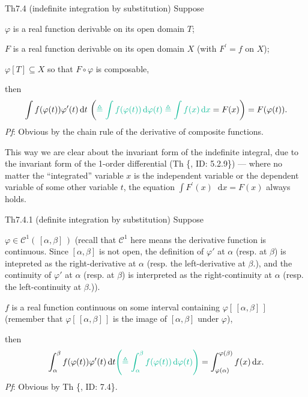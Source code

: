 \documentclass{article}
\newcommand{\dif}{\mathop{}\!\mathrm{d}}
\begin{document}
\begin{Th}{Th7.4 (indefinite integration by substitution)}
    Suppose
    \begin{compactenum}
        \item $\varphi$ is a real function derivable on its open domain $T$;
        \item $F$ is a real function derivable on its open domain $X$ (with $F^\prime = f$ on $X$);
        \item $\varphi[T]\subseteq X$ so that $F\circ\varphi$ is composable,
    \end{compactenum}
    then
    $$\int f(\varphi(t))\varphi'(t)\dif t\, \left(\textcolor{Df}{ \triangleq \int f(\varphi(t))\dif \varphi(t) \triangleq \int f(x)\dif x} = F(x)\right) = F(\varphi(t)). $$
    \tcblower
    \textit{Pf}: Obvious by the chain rule of the derivative of composite functions.
\end{Th}

\begin{Rmk}{}
    This way we are clear about the invariant form of the indefinite integral, due to the invariant form of the 1-order differential (Th \{, ID: 5.2.9\}) — where no matter the ``integrated'' variable $x$ is the independent variable or the dependent variable of some other variable $t$, the equation $\int F^\prime(x)\dif x = F(x)$ always holds.
\end{Rmk}

\begin{Th}{Th7.4.1 (definite integration by substitution)}
    Suppose
    \begin{compactenum}
        \item $\varphi\in\mathcal{C}^1(\,[\alpha, \beta]\,)$ (recall that $\mathcal{C}^1$ here means the derivative function is continuous. \textcolor{Df}{Since $[\alpha,\beta]$ is not open, the definition of $\varphi'$ at $\alpha$ (resp. at $\beta$) is intepreted as the right-derivative at $\alpha$ (resp. the left-derivative at $\beta$.), and the continuity of $\varphi'$ at $\alpha$ (resp. at $\beta$) is interpreted as the right-continuity at $\alpha$ (resp. the left-continuity at $\beta$.)}).
        \item $f$ is a real function continuous on some interval containing $\varphi[\,[\alpha, \beta]\,]$ (remember that $\varphi[\,[\alpha, \beta]\,]$ is the image of $[\alpha, \beta]$ under $\varphi$),
    \end{compactenum}
    then
    $$\int_{\alpha}^{\beta} f(\varphi(t))\varphi'(t)\dif t \textcolor{Df}{\left(\triangleq \int_{\alpha}^{\beta} f(\varphi(t)) \dif \varphi(t) \right)} = \int_{\varphi(\alpha)}^{\varphi(\beta)} f(x)\dif x.$$
    \tcblower
    \textit{Pf}: Obvious by Th \{, ID: 7.4\}.
\end{Th}
\end{document}
